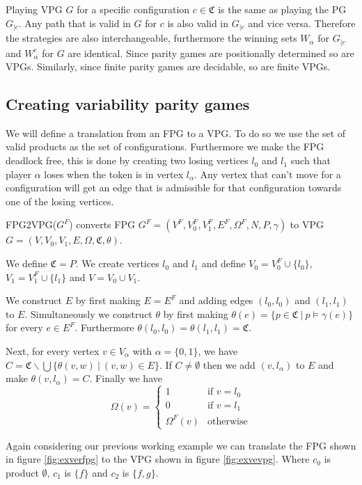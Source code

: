 Playing VPG $G$ for a specific configuration $c \in \mathfrak{C}$ is the same as playing the PG $G_{|c}$. Any path that is valid in $G$ for $c$ is also valid in $G_{|c}$ and vice versa. Therefore the strategies are also interchangeable, furthermore the winning sets $W_\alpha$ for $G_{|c}$ and $W_\alpha^c$ for $G$ are identical. Since parity games are positionally determined so are VPGs. Similarly, since finite parity games are decidable, so are finite VPGs.
\subsection{Creating variability parity games}
We will define a translation from an FPG to a VPG. To do so we use the set of valid products as the set of configurations. Furthermore we make the FPG deadlock free, this is done by creating two losing vertices $l_0$ and $l_1$ such that player $\alpha$ loses when the token is in vertex $l_\alpha$. Any vertex that can't move for a configuration will get an edge that is admissible for that configuration towards one of the losing vertices.
\begin{definition}
	\label{def_FPG2VPG}
	FPG2VPG($G^F$) converts FPG $G^F = (V^F, V_0^F, V_1^F, E^F, \Omega^F, N, P, \gamma)$ to VPG $G = (V, V_0, V_1, E, \Omega, \mathfrak{C}, \theta)$.
	
	We define $\mathfrak{C} = P$. We create vertices $l_0$ and $l_1$ and define $V_0 = V_0^F \cup \{l_0\}$, $V_1 = V_1^F \cup \{l_1\}$ and $V = V_0 \cup V_1$.
	
	We construct $E$ by first making $E = E^F$ and adding edges $(l_0, l_0)$ and $(l_1, l_1)$ to $E$. Simultaneously we construct $\theta$ by first making $\theta(e) = \{p \in \mathfrak{C}\ |\ p \models \gamma(e)\}$ for every $e \in E^F$. Furthermore $\theta(l_0,l_0) = \theta(l_1,l_1) = \mathfrak{C}$.
	
	Next, for every vertex $v \in V_\alpha$ with $\alpha = \{0,1\}$, we have $C = \mathfrak{C} \backslash \bigcup \{\theta(v,w)\ |\ (v,w) \in E\}$. If $C \neq \emptyset$ then we add $(v, l_\alpha)$ to $E$ and make $\theta(v,l_\alpha) = C$.
	Finally we have 
	\[ \Omega(v) = \begin{cases}
	1  & \text{if } v = l_0 \\
	0 & \text{if } v = l_1 \\
	\Omega^F(v) &\text{otherwise}
	\end{cases} \]
\end{definition}
Again considering our previous working example we can translate the FPG shown in figure \ref{fig:exverfpg} to the VPG shown in figure \ref{fig:exvevpg}. Where $c_0$ is product $\emptyset$, $c_1$ is $\{f\}$ and $c_2$ is $\{f,g\}$.

